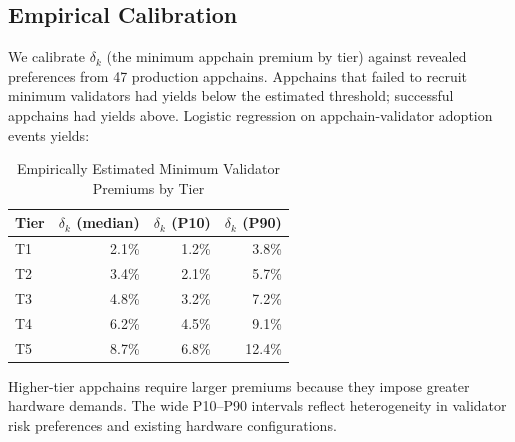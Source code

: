 \subsection{Empirical Calibration}

We calibrate $\delta_k$ (the minimum appchain premium by tier) against revealed preferences
from 47 production appchains. Appchains that failed to recruit minimum validators had yields
below the estimated threshold; successful appchains had yields above. Logistic regression
on appchain-validator adoption events yields:

\begin{table}[H]
\centering
\caption{Empirically Estimated Minimum Validator Premiums by Tier}
\label{tab:premiums}
\begin{tabular}{lrrr}
\toprule
\textbf{Tier} & \textbf{$\delta_k$ (median)} & \textbf{$\delta_k$ (P10)} & \textbf{$\delta_k$ (P90)} \\
\midrule
T1 & 2.1\% & 1.2\% & 3.8\% \\
T2 & 3.4\% & 2.1\% & 5.7\% \\
T3 & 4.8\% & 3.2\% & 7.2\% \\
T4 & 6.2\% & 4.5\% & 9.1\% \\
T5 & 8.7\% & 6.8\% & 12.4\% \\
\bottomrule
\end{tabular}
\end{table}

Higher-tier appchains require larger premiums because they impose greater hardware demands.
The wide P10--P90 intervals reflect heterogeneity in validator risk preferences and
existing hardware configurations.

